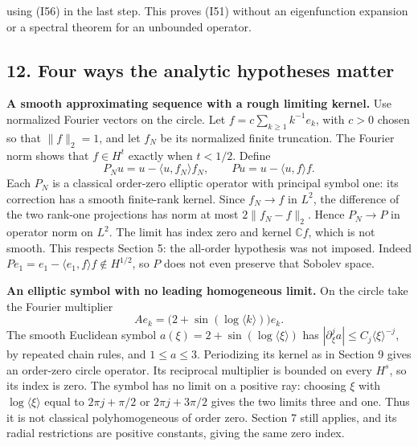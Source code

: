 \documentclass[
  11pt,
]{article}
\makeatletter
\let\ReaderOriginalAnchorStart\hyper@anchorstart
\let\ReaderOriginalAnchorEnd\hyper@anchorend
\let\ReaderPendingAliases\@empty
\def\ReaderArmAliases#1{\gdef\ReaderPendingAliases{#1}}
\def\hyper@anchorstart#1{\ReaderIfNativeAnchorTF{#1}{\ReaderPendingAliases\global\let\ReaderPendingAliases\@empty}{}\ReaderOriginalAnchorStart{#1}}
\makeatother
\begin{document}
using (I56) in the last step. This proves (I51) without an eigenfunction
expansion or a spectral theorem for an unbounded operator.

\ReaderArmAliases{\ReaderOriginalAnchorStart{AN03-GSX-001}\ReaderOriginalAnchorEnd\begingroup\expandafter\def\csname @currentHref\endcsname{AN03-GSX-001}\label{AN03-GSX-001}\endgroup\ReaderOriginalAnchorStart{an03-gsx-001-four-ways-the-analytic-hypotheses-matter}\ReaderOriginalAnchorEnd\begingroup\expandafter\def\csname @currentHref\endcsname{an03-gsx-001-four-ways-the-analytic-hypotheses-matter}\label{an03-gsx-001-four-ways-the-analytic-hypotheses-matter}\endgroup\ReaderOriginalAnchorStart{12-four-ways-the-analytic-hypotheses-matter}\ReaderOriginalAnchorEnd\begingroup\expandafter\def\csname @currentHref\endcsname{12-four-ways-the-analytic-hypotheses-matter}\label{12-four-ways-the-analytic-hypotheses-matter}\endgroup}
\subsection{12. Four ways the analytic hypotheses
matter}\label{four-ways-the-analytic-hypotheses-matter}

\textbf{A smooth approximating sequence with a rough limiting kernel.}
Use normalized Fourier vectors on the circle. Let
\(f=c\sum_{k\geq1}k^{-1}e_k\), with \(c>0\) chosen so that
\(\|f\|_2=1\), and let \(f_N\) be its normalized finite truncation. The
Fourier norm shows that \(f\in H^t\) exactly when \(t<1/2\). Define \[
P_Nu=u-\langle u,f_N\rangle f_N,
\qquad Pu=u-\langle u,f\rangle f.
\tag{I65}
\] Each \(P_N\) is a classical order-zero elliptic operator with
principal symbol one: its correction has a smooth finite-rank kernel.
Since \(f_N\to f\) in \(L^2\), the difference of the two rank-one
projections has norm at most \(2\|f_N-f\|_2\). Hence \(P_N\to P\) in
operator norm on \(L^2\). The limit has index zero and kernel
\(\mathbb C f\), which is not smooth. This respects Section 5: the
all-order hypothesis was not imposed. Indeed
\(Pe_1=e_1-\langle e_1,f\rangle f\notin H^{1/2}\), so \(P\) does not
even preserve that Sobolev space.

\textbf{An elliptic symbol with no leading homogeneous limit.} On the
circle take the Fourier multiplier \[
Ae_k=\bigl(2+\sin(\log\langle k\rangle)\bigr)e_k.
\tag{I66}
\] The smooth Euclidean symbol \(a(\xi)=2+\sin(\log\langle\xi\rangle)\)
has \(|\partial_\xi^j a|\leq C_j\langle\xi\rangle^{-j}\), by repeated
chain rules, and \(1\leq a\leq3\). Periodizing its kernel as in Section
9 gives an order-zero circle operator. Its reciprocal multiplier is
bounded on every \(H^s\), so its index is zero. The symbol has no limit
on a positive ray: choosing \(\xi\) with \(\log\langle\xi\rangle\) equal
to \(2\pi j+\pi/2\) or \(2\pi j+3\pi/2\) gives the two limits three and
one. Thus it is not classical polyhomogeneous of order zero. Section 7
still applies, and its radial restrictions are positive constants,
giving the same zero index.
\end{document}

